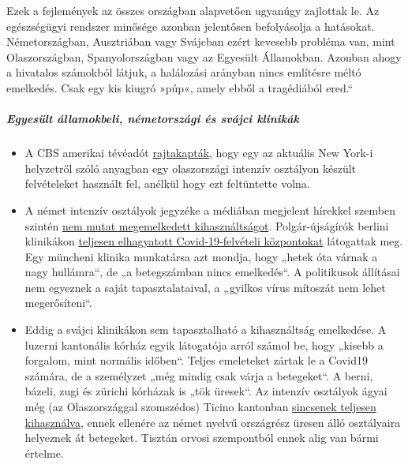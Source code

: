 Ezek a fejlemények az összes országban alapvetően ugyanúgy zajlottak le.
Az egészségügyi rendszer minősége azonban jelentősen befolyásolja a
hatásokat. Németországban, Ausztriában vagy Svájcban ezért kevesebb
probléma van, mint Olaszországban, Spanyolországban vagy az Egyesült
Államokban. Azonban ahogy a hivatalos számokból látjuk, a halálozási
arányban nincs említésre méltó emelkedés. Csak egy kis kiugró »púp«,
amely ebből a tragédiából ered.``

\hypertarget{egyesuxfclt-uxe1llamokbeli-nuxe9metorszuxe1gi-uxe9s-svuxe1jci-klinikuxe1k}{%
\subparagraph{\texorpdfstring{\textbf{Egyesült államokbeli, németországi
és svájci
klinikák}}{Egyesült államokbeli, németországi és svájci klinikák}}\label{egyesuxfclt-uxe1llamokbeli-nuxe9metorszuxe1gi-uxe9s-svuxe1jci-klinikuxe1k}}

\begin{itemize}
\tightlist
\item
  A CBS amerikai tévéadót
  \href{https://www.theblaze.com/news/cbs-news-footage-italy-hospital-nyc}{rajtakapták},
  hogy egy az aktuális New York-i helyzetről szóló anyagban egy
  olaszországi intenzív osztályon készült felvételeket használt fel,
  anélkül hogy ezt feltüntette volna.
\item
  A német intenzív osztályok jegyzéke a médiában megjelent hírekkel
  szemben szintén
  \href{https://www.divi.de/register/intensivregister}{nem mutat
  megemelkedett kihasználtságot}. Polgár-újságírók berlini klinikákon
  \href{https://www.youtube.com/watch?v=WiJszJmGdxY}{teljesen
  elhagyatott Covid-19-felvételi központokat} látogattak meg. Egy
  müncheni klinika munkatársa azt mondja, hogy „hetek óta várnak a nagy
  hullámra``, de „a betegszámban nincs emelkedés``. A politikusok
  állításai nem egyeznek a saját tapasztalataival, a „gyilkos vírus
  mítoszát nem lehet megerősíteni``.
\item
  Eddig a svájci klinikákon sem tapasztalható a kihasználtság
  emelkedése. A luzerni kantonális kórház egyik látogatója arról számol
  be, hogy „kisebb a forgalom, mint normális időben``. Teljes emeleteket
  zártak le a Covid19 számára, de a személyzet „még mindig csak várja a
  betegeket``. A berni, bázeli, zugi és zürichi kórházak is „tök
  üresek``. Az intenzív osztályok ágyai még (az Olaszországgal
  szomszédos) Ticino kantonban
  \href{https://www.nzz.ch/schweiz/tessin-verlegt-erste-corona-patienten-in-deutschschweizer-spitaeler-ld.1549417}{sincsenek
  teljesen kihasználva}, ennek ellenére az német nyelvű országrész
  üresen álló osztályaira helyeznek át betegeket. Tisztán orvosi
  szempontból ennek alig van bármi értelme.
\end{itemize}

